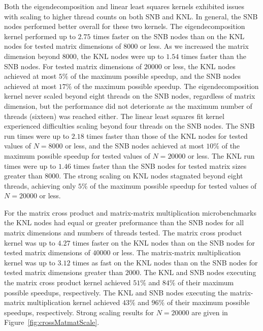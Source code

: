 Both the eigendecomposition and linear least squares kernels exhibited issues with scaling
to higher thread counts on both SNB and KNL. In general, the SNB nodes performed better
overall for these two kernels. The eigendecomposition kernel performed up to $2.75$ times
faster on the SNB nodes than on the KNL nodes for tested matrix dimensions of $8000$ or
less. As we increased the matrix dimension beyond $8000$, the KNL nodes were up to $1.54$
times faster than the SNB nodes. For tested matrix dimensions of $20000$ or less, the KNL
nodes achieved at most $5\%$ of the maximum possible speedup, and the SNB nodes achieved
at most $17\%$ of the maximum possible speedup. The eigendecomposition kernel never scaled
beyond eight threads on the SNB nodes, regardless of matrix dimension, but the performance
did not deteriorate as the maximum number of threads (sixteen) was reached either. The
linear least squares fit kernel experienced difficulties scaling beyond four threads on
the SNB nodes. The SNB run times were up to $2.18$ times faster than those of the KNL
nodes for tested values of $N=8000$ or less, and the SNB nodes achieved at most $10\%$ of
the maximum possible speedup for tested values of $N=20000$ or less. The KNL run times
were up to $1.46$ times faster than the SNB nodes for tested matrix sizes greater than
$8000$. The strong scaling on KNL nodes stagnated beyond eight threads, achieving only
$5\%$ of the maximum possible speedup for tested values of $N=20000$ or less.

For the matrix cross product and matrix-matrix multiplication microbenchmarks the KNL
nodes had equal or greater preformance than the SNB nodes for all matrix dimensions and
numbers of threads tested. The matrix cross product kernel was up to $4.27$ times faster
on the KNL nodes than on the SNB nodes for tested matrix dimensions of $40000$ or less.
The matrix-matrix multiplication kernel was up to $3.12$ times as fast on the KNL nodes
than on the SNB nodes for tested matrix dimensions greater than $2000$. The KNL and SNB
nodes executing the matrix cross product kernel achieved $51\%$ and $84\%$ of their
maximum possible speedups, respectively. The KNL and SNB nodes executing the matrix-matrix
multiplication kernel achieved $43\%$ and $96\%$ of their maximum possible speedups,
respectively. Strong scaling results for $N=20000$ are given in
Figure~\ref{fig:crossMatmatScale}.


